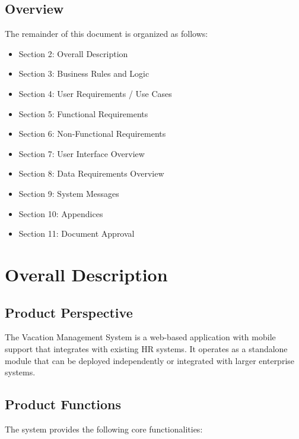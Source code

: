 \documentclass[12pt,a4paper]{article}
\begin{document}
\subsection{Overview}
The remainder of this document is organized as follows:
\begin{itemize}
    \item Section 2: Overall Description
    \item Section 3: Business Rules and Logic
    \item Section 4: User Requirements / Use Cases
    \item Section 5: Functional Requirements
    \item Section 6: Non-Functional Requirements
    \item Section 7: User Interface Overview
    \item Section 8: Data Requirements Overview
    \item Section 9: System Messages
    \item Section 10: Appendices
    \item Section 11: Document Approval
\end{itemize}

\section{Overall Description}

\subsection{Product Perspective}
The Vacation Management System is a web-based application with mobile support that integrates with existing HR systems. It operates as a standalone module that can be deployed independently or integrated with larger enterprise systems.

\subsection{Product Functions}
The system provides the following core functionalities:
\end{document}

